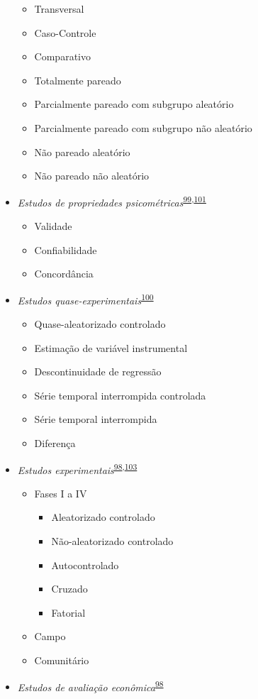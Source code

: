 \documentclass[
]{book}
\begin{document}
\begin{itemize}
  \begin{itemize}
  \item
    Transversal
  \item
    Caso-Controle
  \item
    Comparativo
  \item
    Totalmente pareado
  \item
    Parcialmente pareado com subgrupo aleatório
  \item
    Parcialmente pareado com subgrupo não aleatório
  \item
    Não pareado aleatório
  \item
    Não pareado não aleatório
  \end{itemize}
\item
  \emph{Estudos de propriedades psicométricas}\textsuperscript{\protect\hyperlink{ref-Souza2017}{99},\protect\hyperlink{ref-echevarruxeda-guanilo2019}{101}}

  \begin{itemize}
  \item
    Validade
  \item
    Confiabilidade
  \item
    Concordância
  \end{itemize}
\item
  \emph{Estudos quase-experimentais}\textsuperscript{\protect\hyperlink{ref-reeves2017}{100}}

  \begin{itemize}
  \item
    Quase-aleatorizado controlado
  \item
    Estimação de variável instrumental
  \item
    Descontinuidade de regressão
  \item
    Série temporal interrompida controlada
  \item
    Série temporal interrompida
  \item
    Diferença
  \end{itemize}
\item
  \emph{Estudos experimentais}\textsuperscript{\protect\hyperlink{ref-Suxfct2014}{98},\protect\hyperlink{ref-Chidambaram2019}{103}}

  \begin{itemize}
  \item
    Fases I a IV

    \begin{itemize}
    \item
      Aleatorizado controlado
    \item
      Não-aleatorizado controlado
    \item
      Autocontrolado
    \item
      Cruzado
    \item
      Fatorial
    \end{itemize}
  \item
    Campo
  \item
    Comunitário
  \end{itemize}
\item
  \emph{Estudos de avaliação econômica}\textsuperscript{\protect\hyperlink{ref-Suxfct2014}{98}}


\end{itemize}
\end{document}
